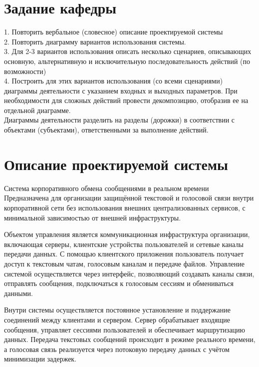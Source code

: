 \thispagestyle{empty}

\newpage
\tableofcontents
\newpage

\section{Задание кафедры}
\begin{sloppypar}
1. Повторить вербальное (словесное) описание проектируемой системы \\
2. Повторить диаграмму вариантов использования системы. \\
3. Для 2-3 вариантов использования описать несколько сценариев, описывающих основную,
альтернативную и исключительную последовательность действий (по возможности) \\
4. Построить для этих вариантов использования (со всеми сценариями) диаграммы
деятельности с указанием входных и выходных параметров. При необходимости для
сложных действий провести декомпозицию, отобразив ее на отдельной диаграмме. \\
Диаграммы деятельности разделить на разделы (дорожки) в соответствии с объектами
(субъектами), ответственными за выполнение действий.
\end{sloppypar}

\section{Описание проектируемой системы}

Система корпоративного обмена сообщениями в реальном времени
Предназначена для организации защищённой текстовой и голосовой связи внутри корпоративной сети без использования внешних централизованных сервисов, с минимальной зависимостью от внешней инфраструктуры.

Объектом управления является коммуникационная инфраструктура организации, включающая серверы, клиентские устройства пользователей и сетевые каналы передачи данных. С помощью клиентского приложения пользователь получает доступ к текстовым чатам, голосовым каналам и передаче файлов. Управление системой осуществляется через интерфейс, позволяющий создавать каналы связи, отправлять сообщения, подключаться к голосовым сессиям и обмениваться данными.

Внутри системы осуществляется постоянное установление и поддержание соединений между клиентами и сервером. Сервер обрабатывает входящие сообщения, управляет сессиями пользователей и обеспечивает маршрутизацию данных. Передача текстовых сообщений происходит в режиме реального времени, а голосовая связь реализуется через потоковую передачу данных с учётом минимизации задержек.

